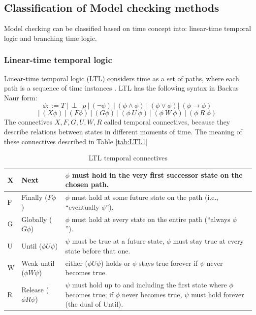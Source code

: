 \subsection {Classification of Model checking methods}
Model checking can be classified based on time concept into:
linear-time temporal logic and branching time logic.
\cite{HuthR1}
\\


\subsubsection{Linear-time temporal logic }
Linear-time temporal logic (LTL) considers time as a set of paths, where each path 
is a sequence of time instances \cite{HuthR1}.
LTL has the following syntax in Backus Naur form:
\[ \phi ::= T\ |\  \perp |\  p\ |\  (\neg\phi)\  |\  (\phi \land \phi)\  |\  (\phi \lor \phi) |\ (\phi \rightarrow \phi)\   \]
\[|\   (X \phi)\  |\  (F \phi)\  |\  (G \phi)\  |\  (\phi\ U\ \phi)\  |\  (\phi\ W\ \phi)\  |\  (\phi\ R\ \phi)\ \]
The connectives $X, F, G, U, W, R$ called temporal connectives, because they describe relations between states in different moments of time.
The meaning of these connectives described in Table \ref{tab:LTL1}\\

\begin{table}[h!]   
    \begin{center}
    \begin{tabular}{| m{0.6cm} | m{3.5cm} | m{9.5cm} |}
        \hline
        X & Next & $\phi$ must hold in the very first successor state on the chosen path.\\
        \hline
        F & Finally ($F \phi$) & $\phi$ must hold at some future state on the path  (i.e., “eventually $\phi$”).\\
        \hline
        G & Globally ($G \phi$) & $\phi$ must hold at every state on the entire path  (“always $\phi$”).\ \ \ \ \ \ \ \ \ \ \\
        \hline
        U & Until ($\phi U \psi$) & $\psi$ must be true at a future state, $\phi$ must stay true at every state before that one.\\
        \hline
        W & Weak until ($\phi W \psi$) & either ($\phi U \psi$) holds or $\phi$ stays true forever if $\psi$ never becomes true.\\
        \hline
        R & Release ($\phi R \psi$) & $\psi$ must hold up to and including the first state where 
        $\phi$ becomes true; if $\phi$ never becomes true, $\psi$ must hold forever (the dual of Until).\\
        \hline
    \end{tabular}
    \caption{LTL temporal connectives}
\end{center}
\end{table}
    \label{tab:LTL1}


